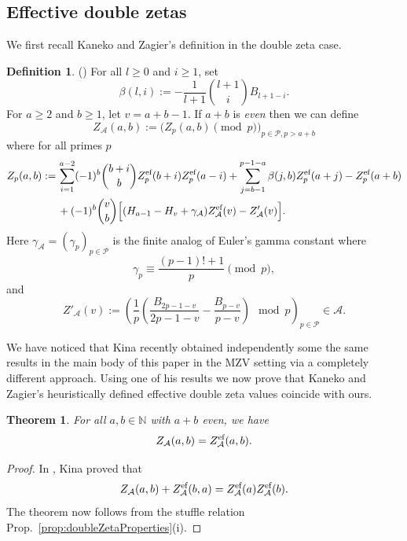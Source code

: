 \documentclass{article}
\newcommand{\gb}{\beta}
\newcommand{\calA}{\mathcal{A}}
\newcommand{\calP}{\mathcal{P}}
\newcommand{\eff}{\text{\rm{ef}}}
\newcommand{\N}{\mathbb{N}}
\theoremstyle{plain}
\newtheorem{thm}{Theorem}[section]
\theoremstyle{definition}
\newtheorem{defn}{Definition}[section]
\begin{document}
\subsection{Effective double zetas}
We first recall Kaneko and Zagier's definition in the double zeta case.

\begin{defn} \label{defn:KZdefn} (\cite[\S 5]{KanekoZa2026})
For all $l\ge 0$ and $i\ge 1$, set
\begin{equation*}
    \gb(l,i):=-\frac{1}{l+1} \binom{l+1}{i} B_{l+1-i}.
\end{equation*}
For $a\ge 2$ and $b\ge 1$, let $v=a+b-1$. If $a+b$ is \emph{even} then we can define
\begin{equation*}
Z_\calA(a,b):=\big(Z_p(a,b) \pmod{p}\big)_{p\in \calP,p>a+b}
\end{equation*}
where for all primes $p$
\begin{align*}
Z_p(a,b):=&\, \sum_{i=1}^{a-2} (-1)^b \binom{b+i}{b}Z_p^\eff(b+i)Z_p^\eff(a-i)+\sum_{j=b-1}^{p-1-a} \gb(j,b)Z_p^\eff(a+j)-Z_p^\eff(a+b)\\
&\, +(-1)^b \binom{v}{b}\Big[(H_{a-1}-H_{v}+\gamma_\calA )Z_\calA^\eff(v) - Z'_\calA(v)\Big].
\end{align*}
Here $\gamma_\calA=(\gamma_p )_{p\in\calP}$ is the finite analog of Euler's gamma constant where
\begin{equation*}
    \gamma_p \equiv \frac{(p-1)!+1}{p} \pmod{p},
\end{equation*}
and
\begin{equation}\label{equ:Zder}
    Z'_\calA(v):=\left(\frac1{p}\left( \frac{B_{2p-1-v}}{2p-1-v}-\frac{B_{p-v}}{p-v} \right)\mod p\right)_{p\in\calP}\in \calA.
\end{equation}
\end{defn}

We have noticed that Kina \cite{Kina2026} recently obtained independently some the same results in the main body of this paper in the MZV setting via a completely different approach. Using one of his results we now prove that Kaneko and Zagier's heuristically defined effective double zeta values coincide with ours.

\begin{thm}\label{thm:KZversion=mine}
For all $a,b\in\N$ with $a+b$ \emph{even}, we have
\begin{equation*}
Z_\calA(a,b)=Z_\calA^\eff(a,b).
\end{equation*}
\end{thm}
\begin{proof}
In \cite{Kina2026}, Kina proved that
\begin{equation*}
Z_\calA(a,b)+Z_\calA^\eff(b,a)=Z_\calA^\eff(a)Z_\calA^\eff(b).
\end{equation*}
The theorem now follows from the stuffle relation Prop.~\ref{prop:doubleZetaProperties}(i).
\end{proof}
\end{document}
